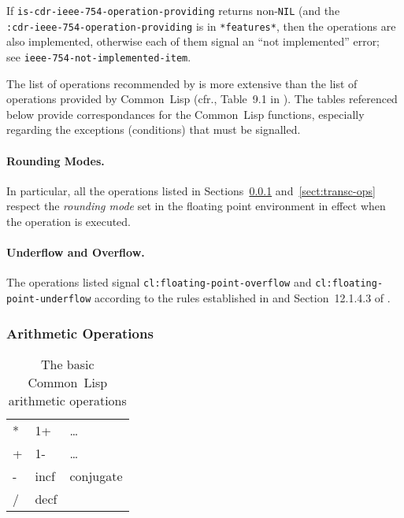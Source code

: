\documentclass[10pt,fleqn]{article}
\newcommand{\CL}{\textsf{Common~Lisp}}
\newcommand{\code}[1]{\texttt{#1}}
\newcommand{\clieeeterm}[1]{\textit{#1}}
\begin{document}
If \code{is-cdr-ieee-754-operation-providing} returns non-\code{NIL}
(and the\\
\code{:cdr-ieee-754-operation-providing} is in
\code{*features*}, then the operations are also implemented, otherwise
each of them signal an ``not implemented'' error;\\
see \code{ieee-754-not-implemented-item}.

The list of operations
recommended by \cite{2008:IEEE-754} is more extensive than the list of
operations provided by \CL{} (cfr., Table~9.1 in \cite{2008:IEEE-754}).
%
The tables referenced below provide correspondances for the \CL{} functions,
especially regarding the exceptions (conditions) that must be
signalled.

\paragraph{Rounding Modes.} In particular, all the operations listed
in Sections~\ref{sect:arith-ops} and~\ref{sect:transc-ops} respect the
\clieeeterm{rounding mode} set in the floating point
environment in effect when the operation is executed.

\paragraph{Underflow and Overflow.}  The operations listed signal
\code{cl:floating-point-overflow} and
\code{cl:floating-point-underflow} according to the rules established
in \cite{2008:IEEE-754} and Section~12.1.4.3 of \cite{1996:ANSIHyperSpec}.


\newpage

\subsubsection{Arithmetic Operations}
\label{sect:arith-ops}

\begin{table}[h!]
  \centering
  \begin{tt}
    \begin{tabular}{lll}
      * & 1+ & \ldots \\
      + & 1- & \ldots \\
      - & incf & conjugate\\
      / & decf & \\
    \end{tabular}
  \end{tt}
  \caption{The basic \CL{} arithmetic operations}
  \label{table:cl-arit-ops}
\end{table}
\end{document}
